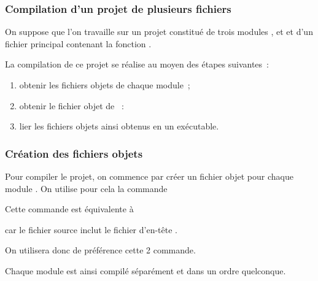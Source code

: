\begin{frame}[fragile]
\frametitle{Compilation d'un projet de plusieurs fichiers}
On suppose que l'on travaille sur un projet constitué de trois modules
,  et  et d'un fichier principal 
contenant la fonction .
\medskip

La compilation de ce projet se réalise au moyen des étapes suivantes~:
\begin{enumerate}
    \item obtenir les fichiers objets de chaque module~;
    \item obtenir le fichier objet de ~:
    \item lier les fichiers objets ainsi obtenus en un exécutable.
\end{enumerate}
\medskip

\begin{center}
\end{center}
\end{frame}

\begin{frame}[fragile]
\frametitle{Création des fichiers objets}
Pour compiler le projet, on commence par créer un fichier objet pour
chaque module . On utilise pour cela la commande
\begin{center}  \end{center}
\medskip

Cette commande est équivalente à
\begin{center}  \end{center}
car le fichier source  inclut le fichier d'en-tête .
\bigskip

On utilisera donc de préférence cette 2\ieme{} commande.
\bigskip
\bigskip

Chaque module est ainsi \alert{compilé séparément} et dans un
\alert{ordre quelconque}.
\end{frame}

